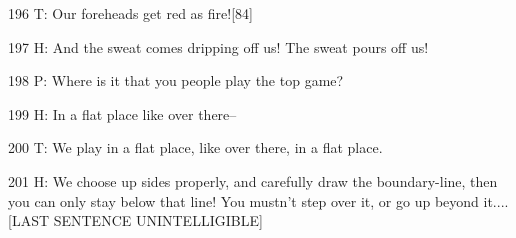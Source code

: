196 T: Our foreheads get red as fire![84]

197 H: And the sweat comes dripping off us! The sweat pours off us!

198 P: Where is it that you people play the top game?

199 H: In a flat place like over there--

200 T: We play in a flat place, like over there, in a flat place.

201 H: We choose up sides properly, and carefully draw the boundary-line, then
you can only stay below that line! You mustn't step over it, or go up beyond it....
[LAST SENTENCE UNINTELLIGIBLE]

